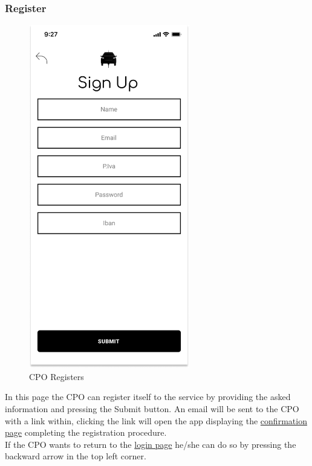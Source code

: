 \subsubsection{Register}
\begin{figure}[H]
    \centering
    \includegraphics[keepaspectratio, height=15cm]{Mockup/CPOAppInterface/Register.png}
    \caption{\ac{CPO} Registers}
    \label{site:Register}
\end{figure}
In this page the \ac{CPO} can register itself to the service by providing the asked information and pressing the Submit button. An email will be sent to the \ac{CPO} with a link within, clicking the link will open the app displaying the \hyperref[site:ConfirmReg]{confirmation page} completing the registration procedure.\\
If the \ac{CPO} wants to return to the \hyperref[fig:Login]{login page} he/she can do so by pressing the backward arrow in the top left corner.
